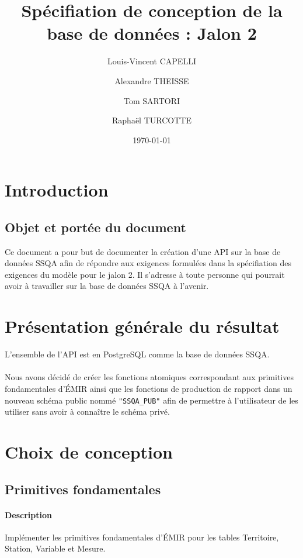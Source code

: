 \documentclass{article}
\begin{document}
\title{Spécifiation de conception de la base de données : Jalon 2}

\author{Louis-Vincent CAPELLI \and Alexandre THEISSE \and Tom SARTORI \and Raphaël TURCOTTE}
\date{\today}
\maketitle
\newpage

\tableofcontents
\newpage

\section{Introduction}
\subsection*{Objet et portée du document}
Ce document a pour but de documenter la création d'une API sur la base de données
SSQA afin de répondre aux exigences formulées dans la
spécifiation des exigences du modèle pour le jalon 2.
Il s'adresse à toute personne qui pourrait avoir à travailler sur la base de données
SSQA à l'avenir.

\section{Présentation générale du résultat}
L'ensemble de l'API est en PostgreSQL comme la base de données SSQA.
\\\\
Nous avons décidé de créer les fonctions atomiques correspondant aux primitives 
fondamentales d'ÉMIR ainsi que les fonctions de production de rapport
dans un nouveau schéma public nommé \texttt{"SSQA\_PUB"}
afin de permettre à l'utilisateur de les utiliser sans avoir à connaître le
schéma privé.


\section{Choix de conception}
\subsection{Primitives fondamentales}
\paragraph{Description} Implémenter les primitives fondamentales d'ÉMIR
pour les tables Territoire, Station, Variable et Mesure.
\end{document}
